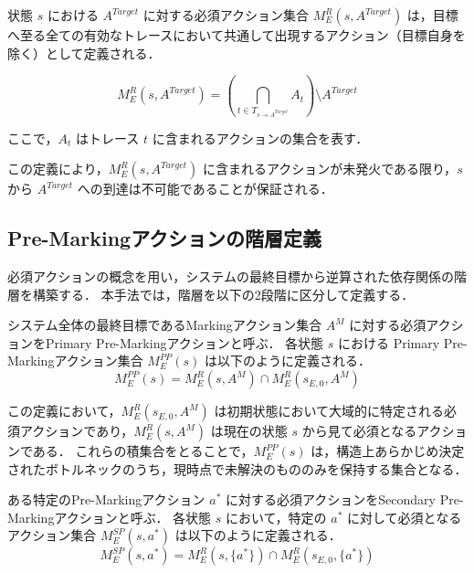\documentclass[a4paper,11pt,oneside,openany,report,dvipdfmx]{jsbook}
\begin{document}
\begin{definition}[必須アクション]
  状態 $s$ における $A^\mathit{Target}$ に対する必須アクション集合 $M^R_E(s, A^\mathit{Target})$ は，目標へ至る全ての有効なトレースにおいて共通して出現するアクション（目標自身を除く）として定義される．

  $$ M^R_E(s, A^\mathit{Target}) = \left( \bigcap_{t \in T_{s \to A^\mathit{Target}}} A_t \right) \setminus A^\mathit{Target} $$

  ここで，$A_t$ はトレース $t$ に含まれるアクションの集合を表す．

\end{definition}

この定義により，$M^R_E(s, A^\mathit{Target})$ に含まれるアクションが未発火である限り，$s$ から $A^\mathit{Target}$ への到達は不可能であることが保証される．

\subsection{Pre-Markingアクションの階層定義}

必須アクションの概念を用い，システムの最終目標から逆算された依存関係の階層を構築する．
本手法では，階層を以下の2段階に区分して定義する．

\begin{definition}
  システム全体の最終目標であるMarkingアクション集合 $A^M$ に対する必須アクションをPrimary Pre-Markingアクションと呼ぶ．
  各状態 $s$ における Primary Pre-Markingアクション集合 $M^\mathit{PP}_E(s)$ は以下のように定義される．
  $$ M^\mathit{PP}_E(s) = M^R_E(s, A^M) \cap M^R_E(s_{E,0}, A^M) $$
\end{definition}

この定義において，$M^R_E(s_{E,0}, A^M)$ は初期状態において大域的に特定される必須アクションであり，$M^R_E(s, A^M)$ は現在の状態 $s$ から見て必須となるアクションである．
これらの積集合をとることで，$M^\mathit{PP}_E(s)$ は，構造上あらかじめ決定されたボトルネックのうち，現時点で未解決のもののみを保持する集合となる．

\begin{definition}
  ある特定のPre-Markingアクション $a^*$ に対する必須アクションをSecondary Pre-Markingアクションと呼ぶ．
  各状態 $s$ において，特定の $a^*$ に対して必須となるアクション集合 $M^\mathit{SP}_E(s, a^*)$ は以下のように定義される．
  $$ M^\mathit{SP}_E(s, a^*) = M^R_E(s, \{a^*\}) \cap M^R_E(s_{E,0}, \{a^*\}) $$
\end{definition}
\end{document}
